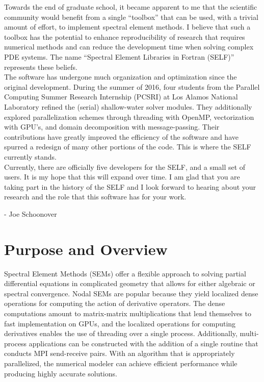 \documentclass[12pt]{softwaremanual}
\begin{document}
  Towards the end of graduate school, it became apparent to me that the scientific community would benefit from a single ``toolbox'' that can be used, with a trivial amount of effort, to implement spectral element methods. I believe that such a toolbox has the potential to enhance reproducibility of research that requires numerical methods and can reduce the development time when solving complex PDE systems. The name ``Spectral Element Libraries in Fortran (SELF)'' represents these beliefs. \\
  
  The software has undergone much organization and optimization since the original development. During the summer of 2016, four students from the Parallel Computing Summer Research Internship (PCSRI) at Los Alamos National Laboratory refined the (serial) shallow-water solver modules. They additionally explored parallelization schemes through threading with OpenMP, vectorization with GPU's, and domain decomposition with message-passing. Their contributions have greatly improved the efficiency of the software and have spurred a redesign of many other portions of the code. This is where the SELF currently stands.\\
  
   Currently, there are officially five developers for the SELF, and a small set of users. It is my hope that this will expand over time. I am glad that you are taking part in the history of the SELF and I look forward to hearing about your research and the role that this software has for your work.
   
   \begin{flushright}
   - Joe Schoonover
   \end{flushright}
 
 \clearpage

\tableofcontents

\pagestyle{myheadings}

\chapter{Purpose and Overview}
 Spectral Element Methods (SEMs) offer a flexible approach to solving partial differential equations in complicated geometry that allows for either algebraic or spectral convergence. Nodal SEMs are popular because they yield localized dense operations for computing the action of derivative operators. The dense computations amount to matrix-matrix multiplications that lend themselves to fast implementation on GPUs, and the localized operations for computing derivatives enables the use of threading over a single process. Additionally, multi-process applications can be constructed with the addition of a single routine that conducts MPI send-receive pairs. With an algorithm that is appropriately parallelized, the numerical modeler can achieve efficient performance while producing highly accurate solutions. 
 
\end{document}
